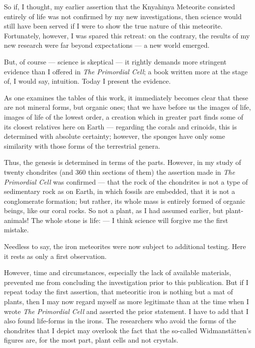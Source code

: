 \documentclass[a4paper, 11pt, oneside]{article}
\begin{document}
So if, I thought, my earlier assertion that the Knyahinya Meteorite consisted entirely of life was not confirmed by my new investigations, then science would still have been served if I were to show the true nature of this meteorite. Fortunately, however, I was spared this retreat: on the contrary, the results of my new research were far beyond expectations — a new world emerged.

But, of course — science is skeptical — it rightly demands more stringent evidence than I offered in \emph{The Primordial Cell}; a book written more at the stage of, I would say, intuition. Today I present the evidence.

As one examines the tables of this work, it immediately becomes clear that these are not mineral forms, but organic ones; that we have before us the images of life, images of life of the lowest order, a creation which in greater part finds some of its closest relatives here on Earth — regarding the corals and crinoids, this is determined with absolute certainty; however, the sponges have only some similarity with those forms of the terrestrial genera.

Thus, the genesis is determined in terms of the parts. However, in my study of twenty chondrites (and 360 thin sections of them) the assertion made in \emph{The Primordial Cell} was confirmed — that the rock of the chondrites is not a type of sedimentary rock as on Earth, in which fossils are embedded, that it is not a conglomerate formation; but rather, its whole mass is entirely formed of organic beings, like our coral rocks. So not a plant, as I had assumed earlier, but plant-animals! The whole stone is life: — I think science will forgive me the first mistake.

Needless to say, the iron meteorites were now subject to additional testing. Here it rests as only a first observation.

However, time and circumstances, especially the lack of available materials, prevented me from concluding the investigation prior to this publication. But if I repeat today the first assertion, that meteoritic iron is nothing but a mat of plants, then I may now regard myself as more legitimate than at the time when I wrote \emph{The Primordial Cell} and asserted the prior statement. I have to add that I also found life-forms in the irons. The researchers who avoid the forms of the chondrites that I depict may overlook the fact that the so-called Widmanstätten's figures are, for the most part, plant cells and not crystals.
\end{document}
